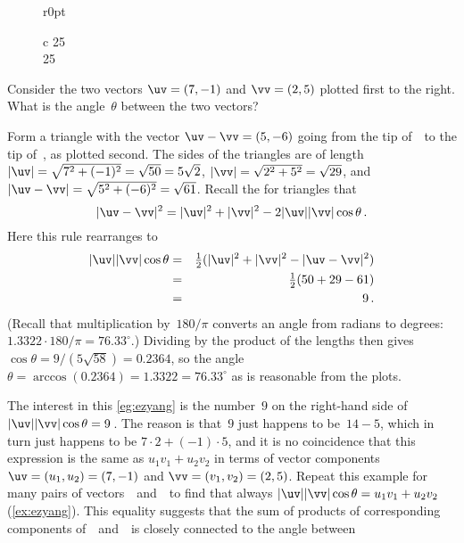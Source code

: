 {%
\def\vecopsHook{\node[above] at (axis cs:0,0) {$\qquad\theta$};}
\begin{wrapfigure}r{0pt}\begin{tabular}c
25\\25
\end{tabular}\end{wrapfigure}
\begin{example} \label{eg:ezyang}
Consider the two vectors \(\uv=(7,-1)\) and \(\vv=(2,5)\) plotted first to the right.
What is the angle~\(\theta\) between the two vectors?
\begin{solution} 
Form a triangle with the vector \(\uv-\vv=(5,-6)\) going from the tip of~\vv\ to the tip of~\uv, as plotted second.
The sides of the triangles are of length \(|\uv|=\sqrt{7^2+(-1)^2}=\sqrt{50}=5\sqrt2\), \(|\vv|=\sqrt{2^2+5^2}=\sqrt{29}\), and \(|\uv-\vv|=\sqrt{5^2+(-6)^2}=\sqrt{61}\).
Recall the  for triangles that
\begin{equation*}
|\uv-\vv|^2=|\uv|^2+|\vv|^2-2|\uv||\vv|\cos\theta \,.
\end{equation*}
Here this rule rearranges to
\begin{eqnarray*}
|\uv||\vv|\cos\theta
&=&\tfrac12(|\uv|^2+|\vv|^2-|\uv-\vv|^2)
\\&=&\tfrac12(50+29-61)
\\&=&9\,.
\end{eqnarray*}
(Recall that multiplication by~\(180/\pi\) converts an angle from radians to degrees: \(1.3322\cdot180/\pi=76.33^\circ\).)
Dividing by the product of the lengths then gives \(\cos\theta=9/(5\sqrt{58})=0.2364\), 
so the angle \(\theta =\arccos(0.2364) =1.3322 =76.33^\circ\) as is reasonable from the plots.
\end{solution}
\end{example}

The interest in this \cref{eg:ezyang} is the number~\(9\) on the right-hand side of \(|\uv||\vv|\cos\theta=9\)\,.  
The reason is that~\(9\) just happens to be~\(14-5\), which in turn just happens to be \(7\cdot2+(-1)\cdot5\), and it is no coincidence that this expression is the same as \(u_1v_1+u_2v_2\) in terms of vector components \(\uv=(u_1,u_2)=(7,-1)\) and \(\vv=(v_1,v_2)=(2,5)\).
Repeat this example for many pairs of vectors~\uv\ and~\vv\ to find that always \(|\uv||\vv|\cos\theta=u_1v_1+u_2v_2\) (\cref{ex:ezyang}).
This equality suggests that the sum of products of corresponding components of~\uv\ and~\vv\ is closely connected to the angle between 
}%


